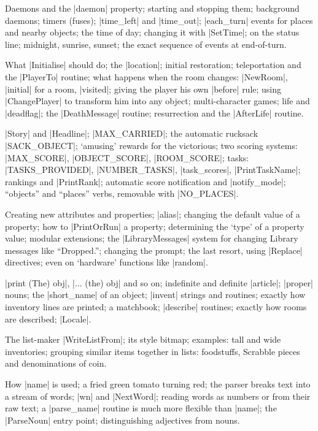 %
Daemons and the |daemon| property; starting and stopping them; background
daemons; timers (fuses); |time_left| and |time_out|; |each_turn| events for
places and nearby objects; the time of day; changing it with |SetTime|; on
the status line; midnight, sunrise, sunset; the exact sequence of events
at end-of-turn.

%
What |Initialise| should do; the |location|; initial restoration;
teleportation and the |PlayerTo| routine; what happens when the room
changes: |NewRoom|, |initial| for a room, |visited|; giving the player his
own |before| rule; using |ChangePlayer| to transform him into any object;
multi-character games; life and |deadflag|; the |DeathMessage| routine;
resurrection and the |AfterLife| routine.

%
|Story| and |Headline|; |MAX_CARRIED|; the automatic rucksack |SACK_OBJECT|;
`amusing' rewards for the victorious; two scoring systems: |MAX_SCORE|,
|OBJECT_SCORE|, |ROOM_SCORE|; tasks: |TASKS_PROVIDED|, |NUMBER_TASKS|,
|task_scores|, |PrintTaskName|; rankings and |PrintRank|; automatic score
notification and |notify_mode|; ``objects'' and ``places'' verbs, removable
with |NO_PLACES|.

%
Creating new attributes and properties; |alias|; changing the default value
of a property; how to |PrintOrRun| a property; determining the `type' of a
property value; modular extensions; the |LibraryMessages| system for
changing Library messages like ``Dropped.''; changing the prompt; the last
resort, using |Replace| directives; even on `hardware' functions like
|random|.

\vfill\eject
{}

%
|print (The) obj|, |... (the) obj| and so on; indefinite and
definite |article|; |proper| nouns; the |short_name| of an object;
|invent| strings and routines; exactly how inventory lines are
printed; a matchbook; |describe| routines; exactly how rooms
are described; |Locale|.

%
The list-maker |WriteListFrom|; its style bitmap; examples: tall and
wide inventories; grouping similar items together in lists: foodstuffs,
Scrabble pieces and denominations of coin.

%
How |name| is used; a fried green tomato turning red; the parser breaks
text into a stream of words; |wn| and |NextWord|; reading words as
numbers or from their raw text; a |parse_name| routine is much more
flexible than |name|; the |ParseNoun| entry point; distinguishing
adjectives from nouns.

